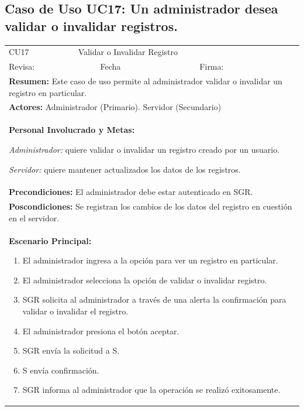 		\subsection{Caso de Uso UC17: Un administrador desea validar o invalidar registros.}
			\begin{longtable}{|l|p{5.5cm}|l|p{2cm}|l|p{1.9cm}|} \hline
					\cellcolor{grisOscuro} CU17 & \multicolumn{4}{|l|}{  \cellcolor{grisOscuro} Validar o Invalidar Registro} &  \cellcolor{grisClaro}\multirow{2}{1cm}{} \\ \cline{1-5}
					\cellcolor{grisOscuro} Revisa: &  \cellcolor{grisClaro} &  \cellcolor{grisOscuro} Fecha &  \cellcolor{grisClaro} &  \cellcolor{grisOscuro} Firma: & \cellcolor{grisClaro} \\ \hline
					\multicolumn{6}{|p{15cm}|}{ \textbf{Resumen: } Este caso de uso permite al administrador validar o invalidar un registro en particular.

					} \\ \hline

					\multicolumn{6}{|p{15cm}|}{ \textbf{Actores: } Administrador (Primario). Servidor (Secundario)

					} \\ \hline

					\multicolumn{6}{|p{15cm}|}{ \textbf{Personal Involucrado y Metas: }
					
					\emph{Administrador:} quiere validar o invalidar un registro creado por un usuario.

					\emph{Servidor:} quiere mantener actualizados los datos de los registros.

					} \\ \hline

					\multicolumn{6}{|p{15cm}|}{ \textbf{Precondiciones: } El administrador debe estar autenticado en SGR.

					} \\ \hline

					\multicolumn{6}{|p{15cm}|}{ \textbf{Poscondiciones: } Se registran los cambios de los datos del registro en cuestión en el servidor.

					} \\ \hline

					\multicolumn{6}{|p{15cm}|}{ \textbf{Escenario Principal: }

					\begin{enumerate}
							\item El administrador ingresa a la opción para ver un registro en particular.
							\item El administrador selecciona la opción de validar o invalidar registro.
							\item SGR solicita al administrador a través de una alerta la confirmación para validar o invalidar el registro.
							\item El administrador presiona el botón aceptar.
							\item SGR envía la solicitud a S.
							\item S envía confirmación.
							\item SGR informa al administrador que la operación se realizó exitosamente.
					\end{enumerate}

}
\end{longtable}
